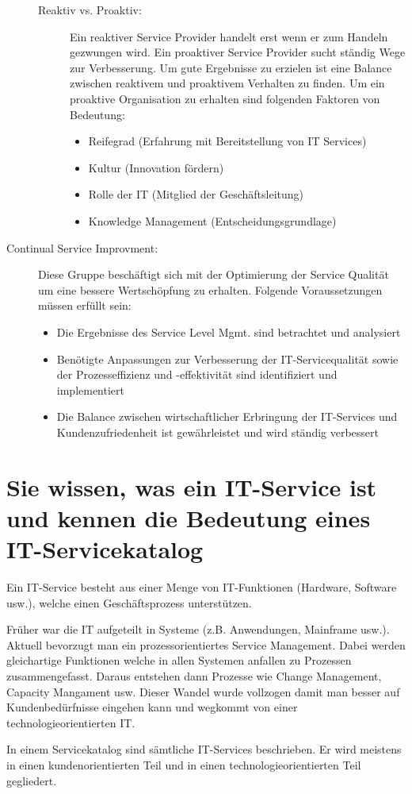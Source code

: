 \begin{description}
\begin{description}
		\item[Reaktiv vs. Proaktiv:] Ein reaktiver Service Provider handelt erst wenn er zum Handeln gezwungen wird. Ein proaktiver Service Provider sucht ständig Wege zur Verbesserung. Um gute Ergebnisse zu erzielen ist eine Balance zwischen reaktivem und proaktivem Verhalten zu finden. Um ein proaktive Organisation zu erhalten sind folgenden Faktoren von Bedeutung:
		\begin{itemize}
			\item Reifegrad (Erfahrung mit Bereitstellung von IT Services)
			\item Kultur (Innovation fördern)
			\item Rolle der IT (Mitglied der Geschäftsleitung)
			\item Knowledge Management (Entscheidungsgrundlage)
		\end{itemize}
	\end{description}
	\item[Continual Service Improvment:] Diese Gruppe beschäftigt sich mit der Optimierung der Service Qualität um eine bessere Wertschöpfung zu erhalten. Folgende Voraussetzungen müssen erfüllt sein:
	\begin{itemize}
		\item Die Ergebnisse des Service Level Mgmt. sind betrachtet und analysiert
		\item Benötigte Anpassungen zur Verbesserung der IT-Servicequalität sowie der Prozesseffizienz und -effektivität sind identifiziert und implementiert
		\item Die Balance zwischen wirtschaftlicher Erbringung der IT-Services und Kundenzufriedenheit ist gewährleistet und wird ständig verbessert
	\end{itemize}
\end{description}

\section{Sie wissen, was ein IT-Service ist und kennen die Bedeutung eines IT-Servicekatalog}

Ein IT-Service besteht aus einer Menge von IT-Funktionen (Hardware, Software usw.), welche einen Geschäftsprozess unterstützen. 

Früher war die IT aufgeteilt in Systeme (z.B. Anwendungen, Mainframe usw.). Aktuell bevorzugt man ein prozessorientiertes Service Management. Dabei werden gleichartige Funktionen welche in allen Systemen anfallen zu Prozessen zusammengefasst. Daraus entstehen dann Prozesse wie Change Management, Capacity Mangament usw. Dieser Wandel wurde vollzogen damit man besser auf Kundenbedürfnisse eingehen kann und wegkommt von einer technologieorientierten IT.

In einem Servicekatalog sind sämtliche IT-Services beschrieben. Er wird meistens in einen kundenorientierten Teil und in einen technologieorientierten Teil gegliedert.